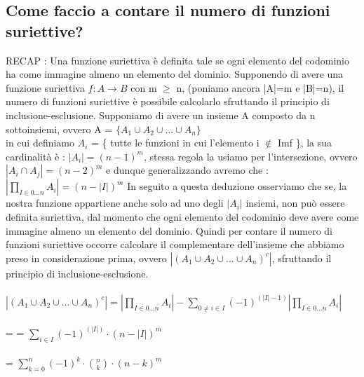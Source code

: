 \documentclass[a4paper,12pt]{report}
\begin{document}
	\subsection{Come faccio a contare il numero di funzioni suriettive?}
	RECAP : Una funzione suriettiva è definita tale se ogni elemento del codominio ha come immagine almeno un elemento del dominio.
	Supponendo di avere una funzione suriettiva $f:A \rightarrow B$ con m $\geq$ n, (poniamo ancora |A|=m e |B|=n), il numero di funzioni suriettive è possibile calcolarlo sfruttando il principio di inclusione-esclusione.
	Supponiamo di avere un insieme A composto da n sottoinsiemi, ovvero A = $\{A_1 \cup A_2 \cup ... \cup A_n\}$ \\ in cui definiamo $A_i$ = \{ tutte le funzioni in cui l'elemento i $\notin$ Imf \}, la sua cardinalità è : $|A_i| = (n - 1)^m$, stessa regola la usiamo per l'intersezione, ovvero $|A_i \cap A_j| = (n - 2)^m$ e dunque generalizzando avremo che : \\ $|\prod_{I \in {0...n}}A_i| = (n - |I|)^m$ In seguito a questa deduzione osserviamo che se, la nostra funzione appartiene anche solo ad uno degli $|A_i|$ insiemi, non può essere definita suriettiva, dal momento che ogni elemento del codominio deve avere come immagine almeno un elemento del dominio. Quindi per contare il numero di funzioni suriettive occorre calcolare  il complementare dell'insieme che abbiamo preso in considerazione prima, ovvero $|(A_1 \cup A_2 \cup ... \cup A_n)^c|$, sfruttando il principio di inclusione-esclusione. \\ \\
	 $|(A_1 \cup A_2 \cup ... \cup A_n)^c| = |\prod_{I \in {0...n}}A_i| - \sum_{0 \neq i \in I}(-1)^{(|I| - 1)}|\prod_{I \in {0...n}}A_i|$ \\ \\
	 = 
	 = $\sum_{i \in I}(-1)^{(|I|)} \cdot (n - |I|)^m$ \\ \\
	 = $\sum_{k = 0}^{n}(-1)^k \cdot \binom{n}{k} \cdot (n - k)^m$
	 \newpage
\end{document}
